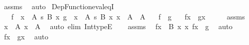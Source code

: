 \begin{isabellebody}
\isamarkupfalse%
\ assms\ \isamarkupfalse%
\ auto%
\endisatagproof
{\isafoldproof}%
%
\isadelimproof
\isanewline
%
\endisadelimproof
\isanewline
{}\isamarkupfalse%
\ Dep{\isacharunderscore}{\kern0pt}Function{\isacharunderscore}{\kern0pt}eval{\isacharunderscore}{\kern0pt}eqI{\isacharcolon}{\kern0pt}\isanewline
\ \ \ {\isachardoublequoteopen}f\ {\isacharcolon}{\kern0pt}\ {\isacharparenleft}{\kern0pt}x\ {\isacharcolon}{\kern0pt}\ A{\isacharparenright}{\kern0pt}\ {\isasymrightarrow}s\ B\ x{\isachardoublequoteclose}\ {\isachardoublequoteopen}g\ {\isacharcolon}{\kern0pt}\ {\isacharparenleft}{\kern0pt}x\ {\isacharcolon}{\kern0pt}\ A{\isacharprime}{\kern0pt}{\isacharparenright}{\kern0pt}\ {\isasymrightarrow}s\ B{\isacharprime}{\kern0pt}\ x{\isachardoublequoteclose}\ {\isachardoublequoteopen}x\ {\isacharcolon}{\kern0pt}\ A\ {\isacharampersand}{\kern0pt}\ A{\isacharprime}{\kern0pt}{\isachardoublequoteclose}\isanewline
\ \ \ {\isachardoublequoteopen}f\ {\isasymsubseteq}\ g{\isachardoublequoteclose}\isanewline
\ \ \ {\isachardoublequoteopen}f{\isacharbackquote}{\kern0pt}x\ {\isacharequal}{\kern0pt}\ g{\isacharbackquote}{\kern0pt}x{\isachardoublequoteclose}\isanewline
%
\isadelimproof
%
\endisadelimproof
%
\isatagproof
{}\isamarkupfalse%
\ {\isacharminus}{\kern0pt}\isanewline
\ \ \isamarkupfalse%
\ assms\ \isamarkupfalse%
\ {\isachardoublequoteopen}x\ {\isacharcolon}{\kern0pt}\ A{\isachardoublequoteclose}\ {\isachardoublequoteopen}x\ {\isacharcolon}{\kern0pt}\ A{\isacharprime}{\kern0pt}{\isachardoublequoteclose}\ \isamarkupfalse%
\ {\isacharparenleft}{\kern0pt}auto\ elim{\isacharcolon}{\kern0pt}\ Int{\isacharunderscore}{\kern0pt}typeE{\isacharparenright}{\kern0pt}\isanewline
\ \ \isamarkupfalse%
\ assms\ \isamarkupfalse%
\ {\isachardoublequoteopen}f{\isacharbackquote}{\kern0pt}x\ {\isacharcolon}{\kern0pt}\ B\ x{\isachardoublequoteclose}\ {\isachardoublequoteopen}{\isasymlangle}x{\isacharcomma}{\kern0pt}\ f{\isacharbackquote}{\kern0pt}x{\isasymrangle}\ {\isasymin}\ g{\isachardoublequoteclose}\ \isamarkupfalse%
\ auto\isanewline
\ \ \isamarkupfalse%
\ \isamarkupfalse%
\ {\isachardoublequoteopen}f{\isacharbackquote}{\kern0pt}x\ {\isacharequal}{\kern0pt}\ g{\isacharbackquote}{\kern0pt}x{\isachardoublequoteclose}\ \isamarkupfalse%
\ auto\isanewline
{}\isamarkupfalse%
%
\endisatagproof
{\isafoldproof}%

\end{isabellebody}
